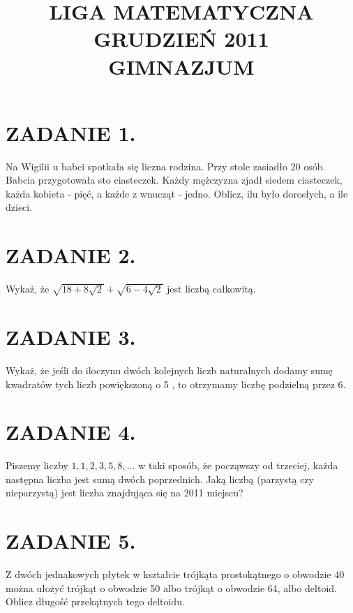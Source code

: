 \documentclass[10pt]{article}
\title{LIGA MATEMATYCZNA \\
 GRUDZIEŃ 2011 \\
 GIMNAZJUM }
\author{}
\date{}
\begin{document}
\maketitle
\section*{ZADANIE 1.}
Na Wigilii u babci spotkała się liczna rodzina. Przy stole zasiadło 20 osób. Babcia przygotowała sto ciasteczek. Każdy mężczyzna zjadł siedem ciasteczek, każda kobieta - pięć, a każde z wnucząt - jedno. Oblicz, ilu było dorosłych, a ile dzieci.

\section*{ZADANIE 2.}
Wykaż, że \(\sqrt{18+8 \sqrt{2}}+\sqrt{6-4 \sqrt{2}}\) jest liczbą całkowitą.

\section*{ZADANIE 3.}
Wykaż, że jeśli do iloczynu dwóch kolejnych liczb naturalnych dodamy sumę kwadratów tych liczb powiększoną o 5 , to otrzymamy liczbę podzielną przez 6.

\section*{ZADANIE 4.}
Piszemy liczby \(1,1,2,3,5,8, \ldots\) w taki sposób, że począwszy od trzeciej, każda następna liczba jest sumą dwóch poprzednich. Jaką liczbą (parzystą czy nieparzystą) jest liczba znajdująca się na 2011 miejscu?

\section*{ZADANIE 5.}
Z dwóch jednakowych płytek w kształcie trójkąta prostokątnego o obwodzie 40 można ułożyć trójkąt o obwodzie 50 albo trójkąt o obwodzie 64, albo deltoid. Oblicz długość przekątnych tego deltoidu.
\end{document}
